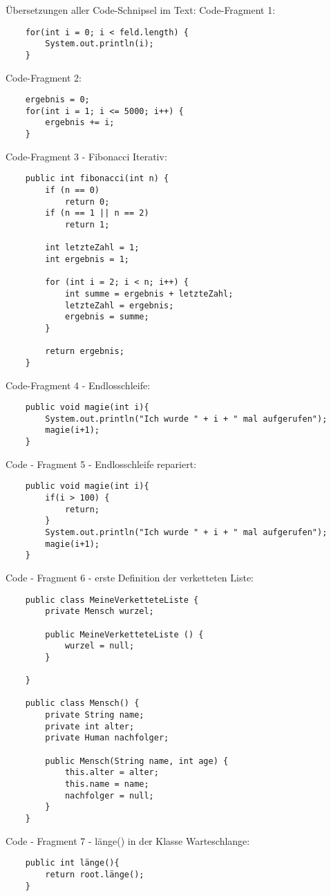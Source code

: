 \documentclass{article}
\begin{document}
Übersetzungen aller Code-Schnipsel im Text:
Code-Fragment 1:
\begin{verbatim}
    for(int i = 0; i < feld.length) {
        System.out.println(i);
    }
\end{verbatim}
Code-Fragment 2:
\begin{verbatim}
    ergebnis = 0;
    for(int i = 1; i <= 5000; i++) {
        ergebnis += i;
    }
\end{verbatim}
Code-Fragment 3 - Fibonacci Iterativ:
\begin{verbatim}
    public int fibonacci(int n) {
        if (n == 0)
            return 0;
        if (n == 1 || n == 2)
            return 1;

        int letzteZahl = 1;
        int ergebnis = 1;

        for (int i = 2; i < n; i++) {
            int summe = ergebnis + letzteZahl;
            letzteZahl = ergebnis;
            ergebnis = summe;
        }

        return ergebnis;
    }
\end{verbatim}
Code-Fragment 4 - Endlosschleife:
\begin{verbatim}
    public void magie(int i){
        System.out.println("Ich wurde " + i + " mal aufgerufen");
        magie(i+1);
    }
\end{verbatim}
Code - Fragment 5 - Endlosschleife repariert:
\begin{verbatim}
    public void magie(int i){
        if(i > 100) {
            return;
        }
        System.out.println("Ich wurde " + i + " mal aufgerufen");
        magie(i+1);
    }
\end{verbatim}
Code - Fragment 6 - erste Definition der verketteten Liste:
\begin{verbatim}
    public class MeineVerketteteListe {
        private Mensch wurzel;

        public MeineVerketteteListe () {
            wurzel = null;
        }

    }

    public class Mensch() {
        private String name; 
        private int alter;
        private Human nachfolger;

        public Mensch(String name, int age) {
            this.alter = alter;
            this.name = name;
            nachfolger = null;
        }
    }
\end{verbatim}
Code - Fragment 7 - länge() in der Klasse Warteschlange:
\begin{verbatim}
    public int länge(){
        return root.länge();
    }
\end{verbatim}
\end{document}
